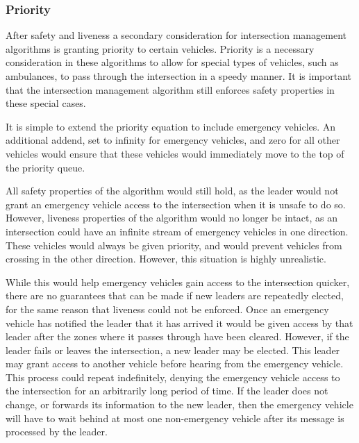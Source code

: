 \documentclass[12pt]{article}
\begin{document}
\subsubsection{Priority}
After safety and liveness a secondary consideration for intersection management algorithms is granting priority to certain vehicles. Priority is a necessary consideration in these algorithms to allow for special types of vehicles, such as ambulances, to pass through the intersection in a speedy manner. It is important that the intersection management algorithm still enforces safety properties in these special cases.\par
It is simple to extend the priority equation to include emergency vehicles. An additional addend, set to infinity for emergency vehicles, and zero for all other vehicles would ensure that these vehicles would immediately move to the top of the priority queue.\par
 All safety properties of the algorithm would still hold, as the leader would not grant an emergency vehicle access to the intersection when it is unsafe to do so. However, liveness properties of the algorithm would no longer be intact, as an intersection could have an infinite stream of emergency vehicles in one direction. These vehicles would always be given priority, and would prevent vehicles from crossing in the other direction. However, this situation is highly unrealistic. \par
While this would help emergency vehicles gain access to the intersection quicker, there are no guarantees that can be made if new leaders are repeatedly elected, for the same reason that liveness could not be enforced. Once an emergency vehicle has notified the leader that it has arrived it would be given access by that leader after the zones where it passes through have been cleared. However, if the leader fails or leaves the intersection, a new leader may be elected. This leader may grant access to another vehicle before hearing from the emergency vehicle. This process could repeat indefinitely, denying the emergency vehicle access to the intersection for an arbitrarily long period of time. If the leader does not change, or forwards its information to the new leader, then the emergency vehicle will have to wait behind at most one non-emergency vehicle after its message is processed by the leader.\par
\end{document}

